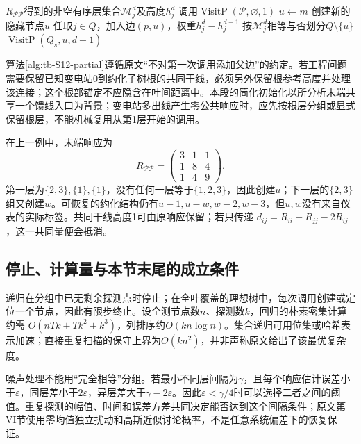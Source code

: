 \begin{algorithm}[htbp]
\caption{S12部分测压递归：原文Algorithm 2的统一记号重述}
\label{alg:tb-S12-partial}
\begin{algorithmic}[1]
\Require $R_{\mathcal P\mathcal P}$得到的非空有序层集合$\mathcal M_j^d$及高度$h_j^d$
\State 调用$\operatorname{VisitP}(\mathcal P,\varnothing,1)$
  \State $u\gets m$
 \Else
  \State 创建新的隐藏节点$u$
 \EndIf
  \State 任取$j\in Q$，加入边$(p,u)$，权重$h_j^d-h_j^{d-1}$
 \EndIf
 \State 按$\mathcal M_j^d$相等与否划分$Q\setminus\{u\}$
  \State $\operatorname{VisitP}(Q_s,u,d+1)$
 \EndFor
\EndFunction
\end{algorithmic}
\end{algorithm}
算法\ref{alg:tb-S12-partial}遵循原文“不对第一次调用添加父边”的约定。若工程问题需要保留已知变电站0到约化子树根的共同干线，必须另外保留根参考高度并处理该连接；这个根部锚定不应隐含在叶间距离中。本段的简化初始化以所分析末端共享一个馈线入口为背景；变电站多出线产生零公共响应时，应先按根层分组或显式保留根层，不能机械复用从第1层开始的调用。

在上一例中，末端响应为
\[
 R_{\mathcal P\mathcal P}=
 \begin{pmatrix}3&1&1\\1&8&4\\1&4&9\end{pmatrix}.
\]
第一层为$\{2,3\},\{1\},\{1\}$，没有任何一层等于$\{1,2,3\}$，因此创建$u$；下一层的$\{2,3\}$组又创建$w$。可恢复的约化结构仍有$u-1,u-w,w-2,w-3$，但$u,w$没有来自仪表的实际标签。共同干线高度1可由原响应保留；若只传递
$d_{ij}=R_{ii}+R_{jj}-2R_{ij}$，这一共同量便会抵消。

\subsection{停止、计算量与本节末尾的成立条件}

递归在分组中已无剩余探测点时停止；在全叶覆盖的理想树中，每次调用创建或定位一个节点，因此有限步终止。设全测节点数$n$、探测数$k$，回归的朴素密集计算约需
$O(nTk+Tk^2+k^3)$，列排序约$O(kn\log n)$。集合递归可用位集或哈希表示加速；直接重复扫描的保守上界为$O(kn^2)$，并非声称原文给出了该最优复杂度。

噪声处理不能用“完全相等”分组。若最小不同层间隔为$\gamma$，且每个响应估计误差小于$\varepsilon$，同层差小于$2\varepsilon$，异层差大于$\gamma-2\varepsilon$。因此$\varepsilon<\gamma/4$时可以选择二者之间的阈值。重复探测的幅值、时间和误差方差共同决定能否达到这个间隔条件；原文第VI节使用零均值独立扰动和高斯近似讨论概率，不是任意系统偏差下的恢复保证。

